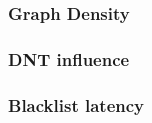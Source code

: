 \documentclass{sig-alternate}
\begin{document}
\subsubsection{Graph Density}
%

\subsubsection{DNT influence}

\subsubsection{Blacklist latency}
\end{document}
